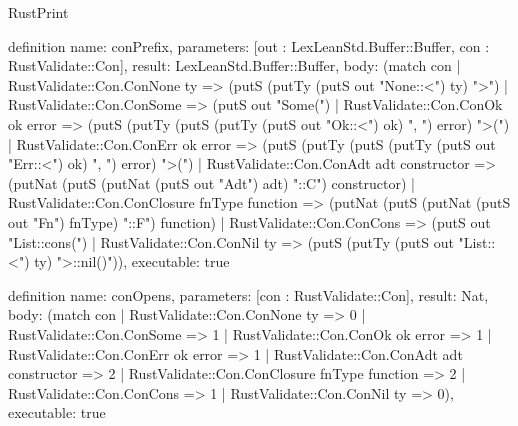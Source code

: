 \begin{lexlean}{RustPrint}
\begin{semanticmodule}
definition{
  name: conPrefix,
  parameters: [out : LexLeanStd.Buffer::Buffer, con : RustValidate::Con],
  result: LexLeanStd.Buffer::Buffer,
  body: (match con
    | RustValidate::Con.ConNone ty => (putS (putTy (putS out "None::<") ty) ">")
    | RustValidate::Con.ConSome => (putS out "Some(")
    | RustValidate::Con.ConOk ok error => (putS (putTy (putS (putTy (putS out "Ok::<") ok) ", ") error) ">(")
    | RustValidate::Con.ConErr ok error => (putS (putTy (putS (putTy (putS out "Err::<") ok) ", ") error) ">(")
    | RustValidate::Con.ConAdt adt constructor => (putNat (putS (putNat (putS out "Adt") adt) "::C") constructor)
    | RustValidate::Con.ConClosure fnType function => (putNat (putS (putNat (putS out "Fn") fnType) "::F") function)
    | RustValidate::Con.ConCons => (putS out "List::cons(")
    | RustValidate::Con.ConNil ty => (putS (putTy (putS out "List::<") ty) ">::nil()")),
  executable: true
}

definition{
  name: conOpens,
  parameters: [con : RustValidate::Con],
  result: Nat,
  body: (match con
    | RustValidate::Con.ConNone ty => 0
    | RustValidate::Con.ConSome => 1
    | RustValidate::Con.ConOk ok error => 1
    | RustValidate::Con.ConErr ok error => 1
    | RustValidate::Con.ConAdt adt constructor => 2
    | RustValidate::Con.ConClosure fnType function => 2
    | RustValidate::Con.ConCons => 1
    | RustValidate::Con.ConNil ty => 0),
  executable: true
}


\end{semanticmodule}
\end{lexlean}
